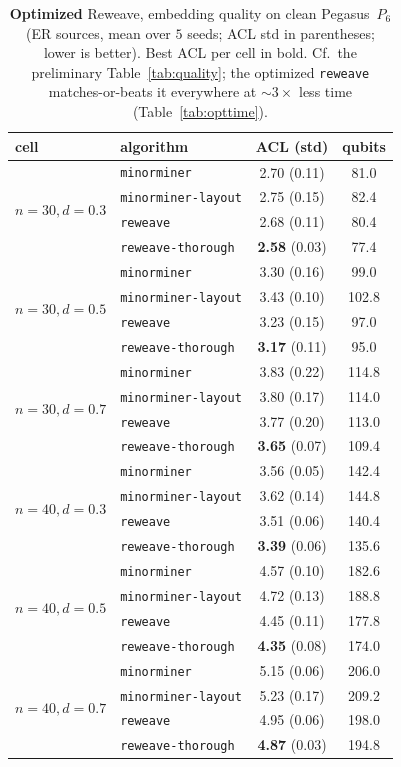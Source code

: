 \documentclass[acmsmall,anonymous,nonacm]{acmart}
\begin{document}
\begin{table}[t]
\caption{\textbf{Optimized} Reweave, embedding quality on clean Pegasus~$P_6$
(ER sources, mean over $5$ seeds; ACL std in parentheses; lower is better). Best
ACL per cell in bold. Cf.\ the preliminary Table~\ref{tab:quality}; the optimized
\texttt{reweave} matches-or-beats it everywhere at ${\sim}3\times$ less time
(Table~\ref{tab:opttime}).}
\label{tab:optquality}
\small
\begin{tabular}{llcc}
\toprule
cell & algorithm & ACL (std) & qubits \\
\midrule
\multirow{4}{*}{$n{=}30,d{=}0.3$}
 & \texttt{minorminer}          & 2.70 (0.11) & 81.0 \\
 & \texttt{minorminer-layout}   & 2.75 (0.15) & 82.4 \\
 & \texttt{reweave}          & 2.68 (0.11) & 80.4 \\
 & \texttt{reweave-thorough} & \textbf{2.58} (0.03) & 77.4 \\
\midrule
\multirow{4}{*}{$n{=}30,d{=}0.5$}
 & \texttt{minorminer}          & 3.30 (0.16) & 99.0 \\
 & \texttt{minorminer-layout}   & 3.43 (0.10) & 102.8 \\
 & \texttt{reweave}          & 3.23 (0.15) & 97.0 \\
 & \texttt{reweave-thorough} & \textbf{3.17} (0.11) & 95.0 \\
\midrule
\multirow{4}{*}{$n{=}30,d{=}0.7$}
 & \texttt{minorminer}          & 3.83 (0.22) & 114.8 \\
 & \texttt{minorminer-layout}   & 3.80 (0.17) & 114.0 \\
 & \texttt{reweave}          & 3.77 (0.20) & 113.0 \\
 & \texttt{reweave-thorough} & \textbf{3.65} (0.07) & 109.4 \\
\midrule
\multirow{4}{*}{$n{=}40,d{=}0.3$}
 & \texttt{minorminer}          & 3.56 (0.05) & 142.4 \\
 & \texttt{minorminer-layout}   & 3.62 (0.14) & 144.8 \\
 & \texttt{reweave}          & 3.51 (0.06) & 140.4 \\
 & \texttt{reweave-thorough} & \textbf{3.39} (0.06) & 135.6 \\
\midrule
\multirow{4}{*}{$n{=}40,d{=}0.5$}
 & \texttt{minorminer}          & 4.57 (0.10) & 182.6 \\
 & \texttt{minorminer-layout}   & 4.72 (0.13) & 188.8 \\
 & \texttt{reweave}          & 4.45 (0.11) & 177.8 \\
 & \texttt{reweave-thorough} & \textbf{4.35} (0.08) & 174.0 \\
\midrule
\multirow{4}{*}{$n{=}40,d{=}0.7$}
 & \texttt{minorminer}          & 5.15 (0.06) & 206.0 \\
 & \texttt{minorminer-layout}   & 5.23 (0.17) & 209.2 \\
 & \texttt{reweave}          & 4.95 (0.06) & 198.0 \\
 & \texttt{reweave-thorough} & \textbf{4.87} (0.03) & 194.8 \\
\bottomrule
\end{tabular}
\end{table}
\end{document}
